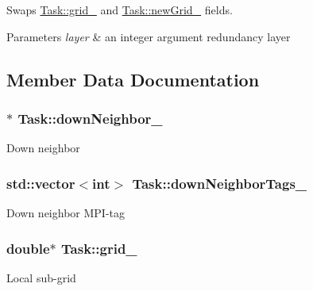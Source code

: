 Swaps \hyperlink{classTask_ab7117d32273662d2695f80f5ea245331}{Task\+::grid\+\_\+} and \hyperlink{classTask_a554be6d55c1e3204cf946d9c0faf97c3}{Task\+::new\+Grid\+\_\+} fields. 


\begin{DoxyParams}{Parameters}
{\em layer} & an integer argument redundancy layer \\
\hline
\end{DoxyParams}


\subsection{Member Data Documentation}
\subsubsection[{\texorpdfstring{down\+Neighbor\+\_\+}{downNeighbor_}}]{$\ast$ Task\+::down\+Neighbor\+\_\+\hspace{0.3cm}{\ttfamily [private]}}\hypertarget{classTask_a8554727d257017a90dbd0d52eaf6fe52}{}\label{classTask_a8554727d257017a90dbd0d52eaf6fe52}
Down neighbor 
\subsubsection[{\texorpdfstring{down\+Neighbor\+Tags\+\_\+}{downNeighborTags_}}]{\setlength{\rightskip}{0pt plus 5cm}std\+::vector$<$int$>$ Task\+::down\+Neighbor\+Tags\+\_\+\hspace{0.3cm}{\ttfamily [private]}}\hypertarget{classTask_a9c1d1cfcf9285f44029a58820ae082a4}{}\label{classTask_a9c1d1cfcf9285f44029a58820ae082a4}
Down neighbor M\+P\+I-\/tag 
\subsubsection[{\texorpdfstring{grid\+\_\+}{grid_}}]{\setlength{\rightskip}{0pt plus 5cm}double$\ast$ Task\+::grid\+\_\+\hspace{0.3cm}{\ttfamily [private]}}\hypertarget{classTask_ab7117d32273662d2695f80f5ea245331}{}\label{classTask_ab7117d32273662d2695f80f5ea245331}
Local sub-\/grid 

